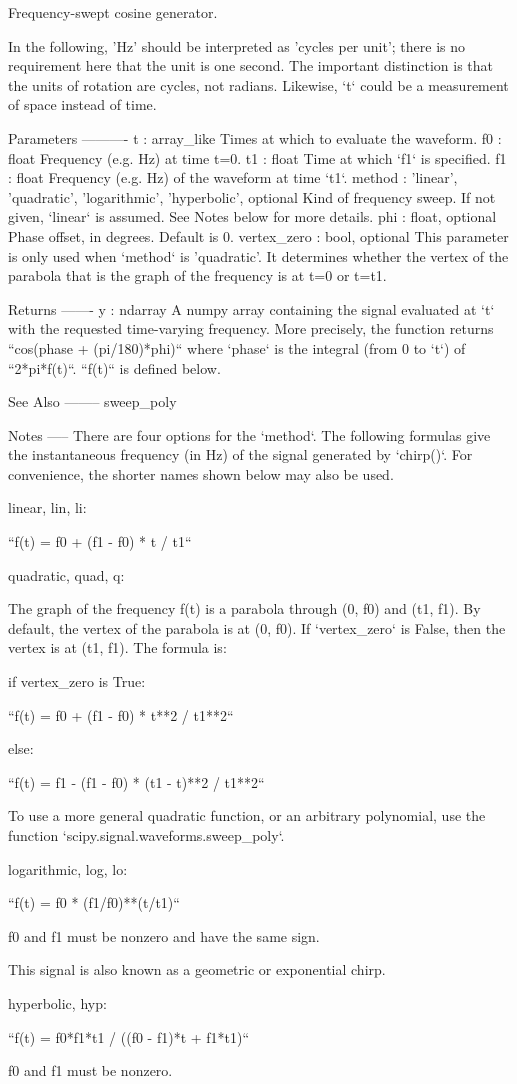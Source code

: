 \begin{DoxyVerb}Frequency-swept cosine generator.

In the following, 'Hz' should be interpreted as 'cycles per unit';
there is no requirement here that the unit is one second.  The
important distinction is that the units of rotation are cycles, not
radians. Likewise, `t` could be a measurement of space instead of time.

Parameters
----------
t : array_like
    Times at which to evaluate the waveform.
f0 : float
    Frequency (e.g. Hz) at time t=0.
t1 : float
    Time at which `f1` is specified.
f1 : float
    Frequency (e.g. Hz) of the waveform at time `t1`.
method : {'linear', 'quadratic', 'logarithmic', 'hyperbolic'}, optional
    Kind of frequency sweep.  If not given, `linear` is assumed.  See
    Notes below for more details.
phi : float, optional
    Phase offset, in degrees. Default is 0.
vertex_zero : bool, optional
    This parameter is only used when `method` is 'quadratic'.
    It determines whether the vertex of the parabola that is the graph
    of the frequency is at t=0 or t=t1.

Returns
-------
y : ndarray
    A numpy array containing the signal evaluated at `t` with the
    requested time-varying frequency.  More precisely, the function
    returns ``cos(phase + (pi/180)*phi)`` where `phase` is the integral
    (from 0 to `t`) of ``2*pi*f(t)``. ``f(t)`` is defined below.

See Also
--------
sweep_poly

Notes
-----
There are four options for the `method`.  The following formulas give
the instantaneous frequency (in Hz) of the signal generated by
`chirp()`.  For convenience, the shorter names shown below may also be
used.

linear, lin, li:

    ``f(t) = f0 + (f1 - f0) * t / t1``

quadratic, quad, q:

    The graph of the frequency f(t) is a parabola through (0, f0) and
    (t1, f1).  By default, the vertex of the parabola is at (0, f0).
    If `vertex_zero` is False, then the vertex is at (t1, f1).  The
    formula is:

    if vertex_zero is True:

        ``f(t) = f0 + (f1 - f0) * t**2 / t1**2``

    else:

        ``f(t) = f1 - (f1 - f0) * (t1 - t)**2 / t1**2``

    To use a more general quadratic function, or an arbitrary
    polynomial, use the function `scipy.signal.waveforms.sweep_poly`.

logarithmic, log, lo:

    ``f(t) = f0 * (f1/f0)**(t/t1)``

    f0 and f1 must be nonzero and have the same sign.

    This signal is also known as a geometric or exponential chirp.

hyperbolic, hyp:

    ``f(t) = f0*f1*t1 / ((f0 - f1)*t + f1*t1)``

    f0 and f1 must be nonzero.\end{DoxyVerb}
